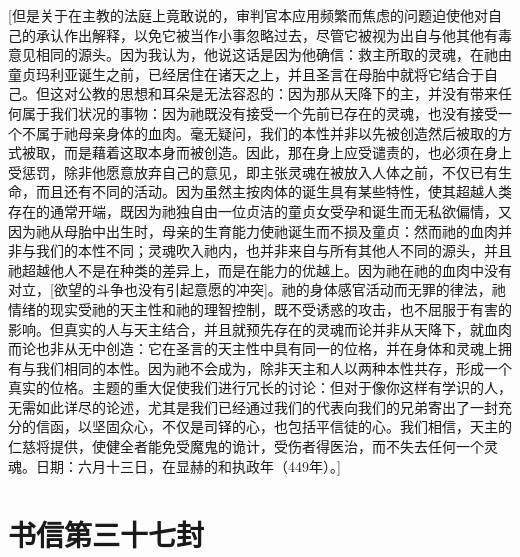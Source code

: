 [但是关于在主教的法庭上竟敢说的，审判官本应用频繁而焦虑的问题迫使他对自己的承认作出解释，以免它被当作小事忽略过去，尽管它被视为出自与他其他有毒意见相同的源头。因为我认为，他说这话是因为他确信：救主所取的灵魂，在祂由童贞玛利亚诞生之前，已经居住在诸天之上，并且圣言在母胎中就将它结合于自己。但这对公教的思想和耳朵是无法容忍的：因为那从天降下的主，并没有带来任何属于我们状况的事物：因为祂既没有接受一个先前已存在的灵魂，也没有接受一个不属于祂母亲身体的血肉。毫无疑问，我们的本性并非以先被创造然后被取的方式被取，而是藉着这取本身而被创造。因此，那在身上应受谴责的，也必须在身上受惩罚，除非他愿意放弃自己的意见，即主张灵魂在被放入人体之前，不仅已有生命，而且还有不同的活动。因为虽然主按肉体的诞生具有某些特性，使其超越人类存在的通常开端，既因为祂独自由一位贞洁的童贞女受孕和诞生而无私欲偏情，又因为祂从母胎中出生时，母亲的生育能力使祂诞生而不损及童贞：然而祂的血肉并非与我们的本性不同；灵魂吹入祂内，也并非来自与所有其他人不同的源头，并且祂超越他人不是在种类的差异上，而是在能力的优越上。因为祂在祂的血肉中没有对立，[欲望的斗争也没有引起意愿的冲突]。祂的身体感官活动而无罪的律法，祂情绪的现实受祂的天主性和祂的理智控制，既不受诱惑的攻击，也不屈服于有害的影响。但真实的人与天主结合，并且就预先存在的灵魂而论并非从天降下，就血肉而论也非从无中创造：它在圣言的天主性中具有同一的位格，并在身体和灵魂上拥有与我们相同的本性。因为祂不会成为，除非天主和人以两种本性共存，形成一个真实的位格。主题的重大促使我们进行冗长的讨论：但对于像你这样有学识的人，无需如此详尽的论述，尤其是我们已经通过我们的代表向我们的兄弟寄出了一封充分的信函，以坚固众心，不仅是司铎的心，也包括平信徒的心。我们相信，天主的仁慈将提供，使健全者能免受魔鬼的诡计，受伤者得医治，而不失去任何一个灵魂。日期：六月十三日，在显赫的和执政年（449年）。]\par



\section{书信第三十七封}

